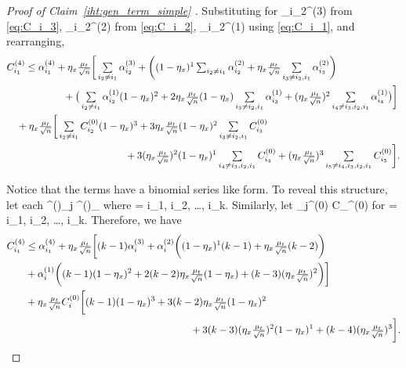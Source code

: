\documentclass{article}
\def\[#1\]{{$#1$}}
\begin{document}
\begin{proof}[Proof of Claim~\ref{iht:gen_term_simple} ]
	Substituting for \[C_{i_2}^{(3)}\] from \eqref{eq:C_i_3}, \[C_{i_2}^{(2)}\] from \eqref{eq:C_i_2}, \[C_{i_2}^{(1)}\] using \eqref{eq:C_i_1}, and rearranging,
	\begin{align*}
	&C_{i_1}^{(4)} 
	\leq \alpha^{(4)}_{i_1} + \eta_x\tfrac{\mu_t}{\sqrt{n}}\bigg[  \textstyle\sum\limits_{i_2 \neq i_1} \alpha^{(3)}_{i_2} + \bigg((1-\eta_x)^{1}\sum_{i_2 \neq i_1} \alpha^{(2)}_{i_2} + \eta_x\tfrac{\mu_t}{\sqrt{n}} \sum\limits_{i_3 \neq i_2, i_1}\alpha^{(2)}_{i_3}\bigg) \notag \\
	&\hspace{2cm}  + \big(\textstyle\sum\limits_{i_2 \neq i_1} \alpha^{(1)}_{i_2}(1-\eta_x)^{2} +2\eta_x\tfrac{\mu_t}{\sqrt{n}}(1-\eta_x) \sum\limits_{i_3 \neq i_2, i_1}\alpha^{(1)}_{i_3} + (\eta_x\tfrac{\mu_t}{\sqrt{n}})^2 \sum\limits_{i_4 \neq i_3, i_2, i_1} \alpha^{(1)}_{i_4} \big) \bigg] \notag\\
	&~~~+ \eta_x\tfrac{\mu_t}{\sqrt{n}}\bigg[\textstyle\sum\limits_{i_2 \neq i_1} C_{i_2}^{(0)}(1-\eta_x)^{3}
	+ 3\eta_x\tfrac{\mu_t}{\sqrt{n}}(1-\eta_x)^{2}\textstyle\sum\limits_{i_3 \neq i_2, i_1} C_{i_3}^{(0)}
	\\& \hspace{4.2cm}+3(\eta_x\tfrac{\mu_t}{\sqrt{n}})^2(1-\eta_x)^{1}\textstyle\sum\limits_{i_4 \neq i_3, i_2, i_1} C_{i_4}^{(0)} 
	 +  (\eta_x\tfrac{\mu_t}{\sqrt{n}})^3\textstyle\sum\limits_{i_5 \neq i_4, i_3, i_2, i_1} C_{i_5}^{(0)}\bigg].
	\end{align*}
	
	
	Notice that the terms have a binomial series like form.  To reveal this structure, let each \[\alpha^{(\ell)}_{j} \leq \alpha^{(\ell)}_{\max}\] where \[ j = i_1, i_2, \dots, i_k\]. Similarly, let \[C_{j}^{(0)} \leq C_{\max}^{(0)}\] for \[j = i_1, i_2, \dots, i_k\]. Therefore, we have
	\begin{align*}
	C_{i_1}^{(4)} 
	&\leq \alpha^{(4)}_{i_1} + \eta_x\tfrac{\mu_t}{\sqrt{n}}\bigg[ (k-1) \alpha^{(3)}_{i} + \alpha^{(2)}_{i}\bigg((1-\eta_x)^{1}(k-1) + \eta_x\tfrac{\mu_t}{\sqrt{n}} (k-2)\bigg) \notag \\
	&  + \alpha^{(1)}_{i}\bigg( (k-1) (1-\eta_x)^{2} +2(k-2)\eta_x\tfrac{\mu_t}{\sqrt{n}}(1-\eta_x) + (k-3)(\eta_x\tfrac{\mu_t}{\sqrt{n}})^2 \bigg) \bigg] \notag\\
	&+ \eta_x\tfrac{\mu_t}{\sqrt{n}}C_{i}^{(0)}\bigg[(k-1) (1-\eta_x)^{3}
	+ 3(k-2)\eta_x\tfrac{\mu_t}{\sqrt{n}}(1-\eta_x)^{2} 
	\\&\hspace{5.8cm}+3(k-3)(\eta_x\tfrac{\mu_t}{\sqrt{n}})^2(1-\eta_x)^{1}
	+  (k-4)(\eta_x\tfrac{\mu_t}{\sqrt{n}})^3 \bigg].
	\end{align*}
	

\end{proof}
\end{document}
